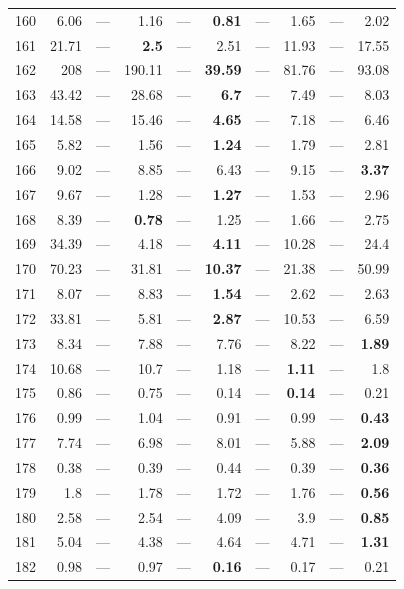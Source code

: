 \begin{longtable}{lr@{\hskip 4pt}l@{\hskip 12pt}r@{\hskip 4pt}l@{\hskip 12pt}r@{\hskip 4pt}l@{\hskip 12pt}r@{\hskip 4pt}l@{\hskip 12pt}r}
160 & 6.06 & --- & 1.16 & --- & \textbf{0.81} & --- & 1.65 & --- & 2.02 \\
161 & 21.71 & --- & \textbf{2.5} & --- & 2.51 & --- & 11.93 & --- & 17.55 \\
162 & 208 & --- & 190.11 & --- & \textbf{39.59} & --- & 81.76 & --- & 93.08 \\
163 & 43.42 & --- & 28.68 & --- & \textbf{6.7} & --- & 7.49 & --- & 8.03 \\
164 & 14.58 & --- & 15.46 & --- & \textbf{4.65} & --- & 7.18 & --- & 6.46 \\
165 & 5.82 & --- & 1.56 & --- & \textbf{1.24} & --- & 1.79 & --- & 2.81 \\
166 & 9.02 & --- & 8.85 & --- & 6.43 & --- & 9.15 & --- & \textbf{3.37} \\
167 & 9.67 & --- & 1.28 & --- & \textbf{1.27} & --- & 1.53 & --- & 2.96 \\
168 & 8.39 & --- & \textbf{0.78} & --- & 1.25 & --- & 1.66 & --- & 2.75 \\
169 & 34.39 & --- & 4.18 & --- & \textbf{4.11} & --- & 10.28 & --- & 24.4 \\
170 & 70.23 & --- & 31.81 & --- & \textbf{10.37} & --- & 21.38 & --- & 50.99 \\
171 & 8.07 & --- & 8.83 & --- & \textbf{1.54} & --- & 2.62 & --- & 2.63 \\
172 & 33.81 & --- & 5.81 & --- & \textbf{2.87} & --- & 10.53 & --- & 6.59 \\
173 & 8.34 & --- & 7.88 & --- & 7.76 & --- & 8.22 & --- & \textbf{1.89} \\
174 & 10.68 & --- & 10.7 & --- & 1.18 & --- & \textbf{1.11} & --- & 1.8 \\
175 & 0.86 & --- & 0.75 & --- & 0.14 & --- & \textbf{0.14} & --- & 0.21 \\
176 & 0.99 & --- & 1.04 & --- & 0.91 & --- & 0.99 & --- & \textbf{0.43} \\
177 & 7.74 & --- & 6.98 & --- & 8.01 & --- & 5.88 & --- & \textbf{2.09} \\
178 & 0.38 & --- & 0.39 & --- & 0.44 & --- & 0.39 & --- & \textbf{0.36} \\
179 & 1.8 & --- & 1.78 & --- & 1.72 & --- & 1.76 & --- & \textbf{0.56} \\
180 & 2.58 & --- & 2.54 & --- & 4.09 & --- & 3.9 & --- & \textbf{0.85} \\
181 & 5.04 & --- & 4.38 & --- & 4.64 & --- & 4.71 & --- & \textbf{1.31} \\
182 & 0.98 & --- & 0.97 & --- & \textbf{0.16} & --- & 0.17 & --- & 0.21 \\

\end{longtable}
